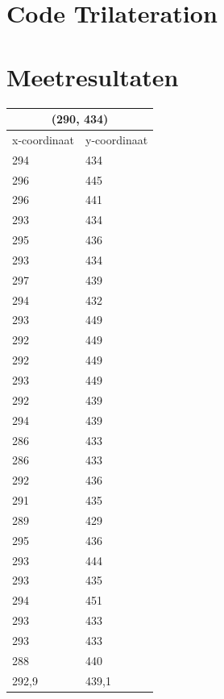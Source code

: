 \documentclass{article}
\begin{document}
\section{Code Trilateration}

\newpage
\section{Meetresultaten}
\begin{tabular}{ |l|l| }
  \hline
  \multicolumn{2}{|c|}{(290, 434)} \\
  \hline
  x-coordinaat & y-coordinaat \\ \hline
     294 & 434\\ \hline
     296 & 445\\ \hline
     296 & 441\\ \hline
     293 & 434\\ \hline
     295 & 436\\ \hline
     293 & 434\\ \hline
     297 & 439\\ \hline
     294 & 432\\ \hline
     293 & 449\\ \hline
     292 & 449\\ \hline
     292 & 449\\ \hline
     293 & 449\\ \hline
     292 & 439\\ \hline
     294 & 439\\ \hline
     286 & 433\\ \hline
     286 & 433\\ \hline
     292 & 436\\ \hline
     291 & 435\\ \hline
     289 & 429\\ \hline
     295 & 436\\ \hline
     293 & 444\\ \hline
     293 & 435\\ \hline
     294 & 451\\ \hline
     293 & 433\\ \hline
     293 & 433\\ \hline
     288 & 440\\ \hline\hline
     292,9 & 439,1 \\ \hline
\end{tabular}
\end{document}
